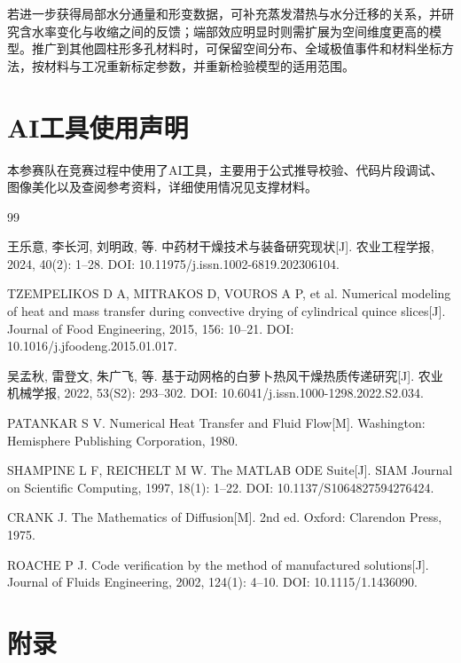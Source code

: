\documentclass[UTF8,a4paper]{ctexart}
\begin{document}
若进一步获得局部水分通量和形变数据，可补充蒸发潜热与水分迁移的关系，并研究含水率变化与收缩之间的反馈；端部效应明显时则需扩展为空间维度更高的模型。推广到其他圆柱形多孔材料时，可保留空间分布、全域极值事件和材料坐标方法，按材料与工况重新标定参数，并重新检验模型的适用范围。



\section*{AI工具使用声明}

本参赛队在竞赛过程中使用了AI工具，主要用于公式推导校验、代码片段调试、图像美化以及查阅参考资料，详细使用情况见支撑材料。


\begin{thebibliography}{99}
\raggedright

王乐意, 李长河, 刘明政, 等.
中药材干燥技术与装备研究现状[J].
农业工程学报, 2024, 40(2): 1--28.
DOI: 10.11975/j.issn.1002-6819.202306104.

TZEMPELIKOS D A, MITRAKOS D, VOUROS A P, et al.
Numerical modeling of heat and mass transfer during convective drying of cylindrical quince slices[J].
Journal of Food Engineering, 2015, 156: 10--21.
DOI: 10.1016/j.jfoodeng.2015.01.017.

吴孟秋, 雷登文, 朱广飞, 等.
基于动网格的白萝卜热风干燥热质传递研究[J].
农业机械学报, 2022, 53(S2): 293--302.
DOI: 10.6041/j.issn.1000-1298.2022.S2.034.

PATANKAR S V.
Numerical Heat Transfer and Fluid Flow[M].
Washington: Hemisphere Publishing Corporation, 1980.

SHAMPINE L F, REICHELT M W.
The MATLAB ODE Suite[J].
SIAM Journal on Scientific Computing, 1997, 18(1): 1--22.
DOI: 10.1137/S1064827594276424.

CRANK J.
The Mathematics of Diffusion[M].
2nd ed.
Oxford: Clarendon Press, 1975.

ROACHE P J.
Code verification by the method of manufactured solutions[J].
Journal of Fluids Engineering, 2002, 124(1): 4--10.
DOI: 10.1115/1.1436090.

\end{thebibliography}

\newpage

\section*{附录}




\end{document}
